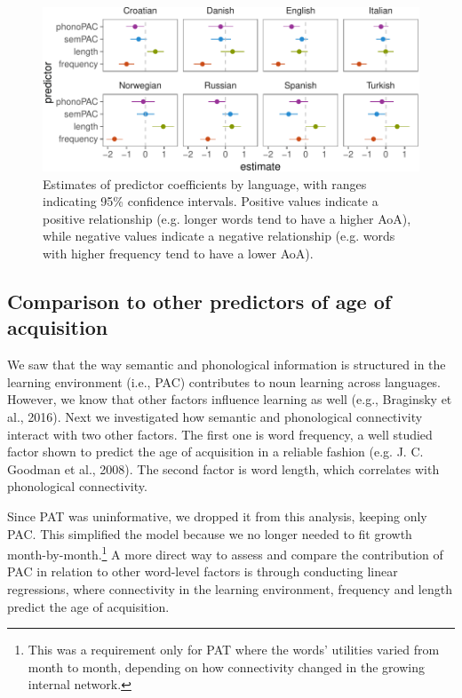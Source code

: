\documentclass[10pt, letterpaper]{article}
\newenvironment{CodeChunk}{}{}
\begin{document}
\begin{CodeChunk}
\begin{figure}[h]

{\centering \includegraphics{figs/regressions_img-1} 

}

\caption{\label{fig:regressions_img}Estimates of predictor coefficients by language, with ranges indicating 95\% confidence intervals. Positive values indicate a positive relationship (e.g. longer words tend to have a higher AoA), while negative values indicate a negative relationship (e.g. words with higher frequency tend to have a lower AoA).}\label{fig:regressions_img}
\end{figure}
\end{CodeChunk}

\subsection{Comparison to other predictors of age of
acquisition}\label{comparison-to-other-predictors-of-age-of-acquisition}

We saw that the way semantic and phonological information is structured
in the learning environment (i.e., PAC) contributes to noun learning
across languages. However, we know that other factors influence learning
as well (e.g., Braginsky et al., 2016). Next we investigated how
semantic and phonological connectivity interact with two other factors.
The first one is word frequency, a well studied factor shown to predict
the age of acquisition in a reliable fashion (e.g. J. C. Goodman et al.,
2008). The second factor is word length, which correlates with
phonological connectivity.

Since PAT was uninformative, we dropped it from this analysis, keeping
only PAC. This simplified the model because we no longer needed to fit
growth
month-by-month.\footnote{This was a requirement only for PAT where the words' utilities varied from month to month, depending on how connectivity changed in the growing internal network.}
A more direct way to assess and compare the contribution of PAC in
relation to other word-level factors is through conducting linear
regressions, where connectivity in the learning environment, frequency
and length predict the age of acquisition.
\end{document}

